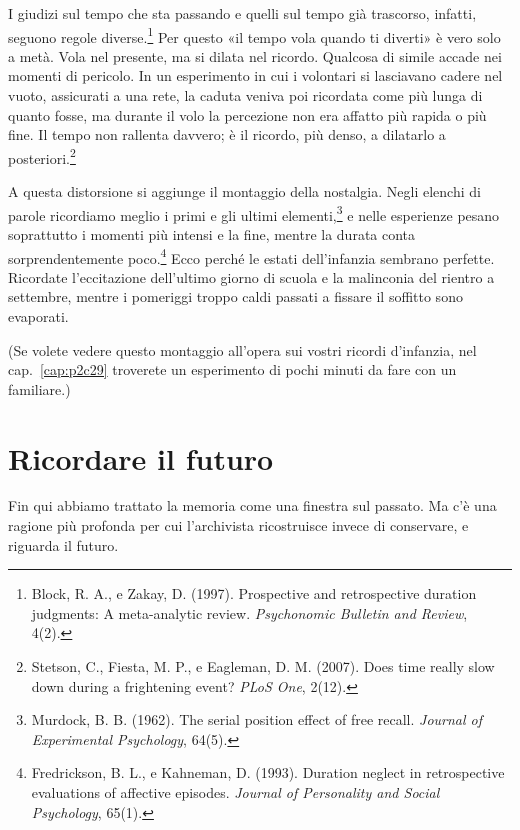 
I giudizi sul tempo che sta passando e quelli sul tempo già trascorso, infatti, seguono regole diverse.\footnote{Block, R. A., e Zakay, D. (1997). Prospective and retrospective duration judgments: A meta-analytic review. \textit{Psychonomic Bulletin and Review}, 4(2).} Per questo «il tempo vola quando ti diverti» è vero solo a metà. Vola nel presente, ma si dilata nel ricordo. Qualcosa di simile accade nei momenti di pericolo. In un esperimento in cui i volontari si lasciavano cadere nel vuoto, assicurati a una rete, la caduta veniva poi ricordata come più lunga di quanto fosse, ma durante il volo la percezione non era affatto più rapida o più fine. Il tempo non rallenta davvero; è il ricordo, più denso, a dilatarlo a posteriori.\footnote{Stetson, C., Fiesta, M. P., e Eagleman, D. M. (2007). Does time really slow down during a frightening event? \textit{PLoS One}, 2(12).}

A questa distorsione si aggiunge il montaggio della nostalgia. Negli elenchi di parole ricordiamo meglio i primi e gli ultimi elementi,\footnote{Murdock, B. B. (1962). The serial position effect of free recall. \textit{Journal of Experimental Psychology}, 64(5).} e nelle esperienze pesano soprattutto i momenti più intensi e la fine, mentre la durata conta sorprendentemente poco.\footnote{Fredrickson, B. L., e Kahneman, D. (1993). Duration neglect in retrospective evaluations of affective episodes. \textit{Journal of Personality and Social Psychology}, 65(1).} Ecco perché le estati dell'infanzia sembrano perfette. Ricordate l'eccitazione dell'ultimo giorno di scuola e la malinconia del rientro a settembre, mentre i pomeriggi troppo caldi passati a fissare il soffitto sono evaporati.

(Se volete vedere questo montaggio all'opera sui vostri ricordi d'infanzia, nel cap.~\ref{cap:p2c29} troverete un esperimento di pochi minuti da fare con un familiare.)

\section{Ricordare il futuro}
\label{sec:p1c6-futuro}

Fin qui abbiamo trattato la memoria come una finestra sul passato. Ma c'è una ragione più profonda per cui l'archivista ricostruisce invece di conservare, e riguarda il futuro.

